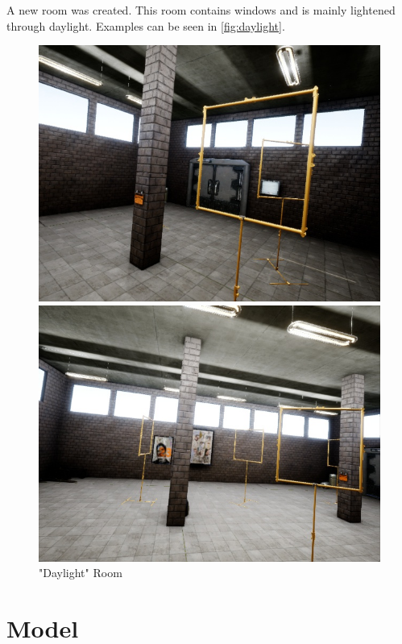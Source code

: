 \documentclass{article}
\begin{document}
A new room was created. This room contains windows and is mainly lightened through daylight. Examples can be seen in \autoref{fig:daylight}.
\begin{figure}
	\centering
	\begin{minipage}{0.4\linewidth}
		\includegraphics[width=\linewidth]{fig/daylight_1}
	\end{minipage}
	\begin{minipage}{0.4\linewidth}
	\includegraphics[width=\linewidth]{fig/daylight_2}
	\end{minipage}
\label{fig:daylight}
\caption{"Daylight" Room}
\end{figure}

\section{Model}
\end{document}

